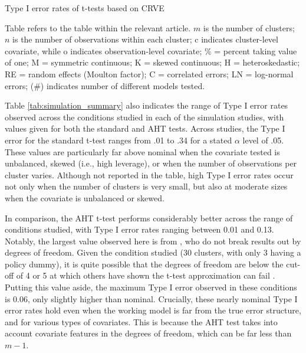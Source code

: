 \documentclass[draft]{ectaart}\usepackage[]{graphicx}\usepackage[]{color}
\begin{document}
\begin{table}
\small
\caption{Type I error rates of t-tests based on CRVE}
\label{tab:simulation_summary}

\caption*{Table refers to the table within the relevant article. $m$ is the number of clusters; $n$ is the number of observations within each cluster; c indicates cluster-level covariate, while o indicates observation-level covariate; \% = percent taking value of one; M = symmetric continuous; K = skewed continuous; H = heteroskedastic; RE = random effects (Moulton factor); C = correlated errors; LN = log-normal errors; (\#) indicates number of different models tested.}
\end{table}

Table \ref{tab:simulation_summary} also indicates the range of Type I error rates observed across the conditions studied in each of the simulation studies, with values given for both the standard and AHT tests.
Across studies, the Type I error for the standard t-test ranges from .01 to .34 for a stated $\alpha$ level of .05.
These values are particularly far above nominal when the covariate tested is unbalanced, skewed (i.e., high leverage), or when the number of observations per cluster varies. 
Although not reported in the table, high Type I error rates occur not only when the number of clusters is very small, but also at moderate sizes when the covariate is unbalanced or skewed. 

In comparison, the AHT t-test performs considerably better across the range of conditions studied, with Type I error rates ranging between 0.01 and 0.13.
Notably, the largest value observed here is from \citet{Imbens2015robust}, who do not break results out by degrees of freedom. 
Given the condition studied (30 clusters, with only 3 having a policy dummy), it is quite possible that the degrees of freedom are below the cut-off of 4 or 5 at which others have shown the t-test approximation can fail \citep{Tipton2015small-t}. 
Putting this value aside, the maximum Type I error observed in these conditions is 0.06, only slightly higher than nominal.
Crucially, these nearly nominal Type I error rates hold even when the working model is far from the true error structure, and for various types of covariates.
This is because the AHT test takes into account covariate features in the degrees of freedom, which can be far less than $m - 1$.
\end{document}
